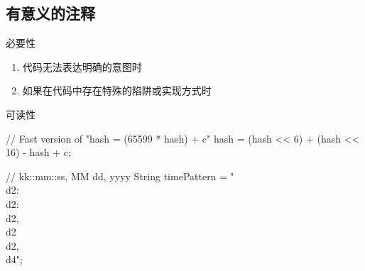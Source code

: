 \subsection{有意义的注释}

\begin{frame}[fragile]{必要性}
\begin{enumerate}
  \item 代码无法表达明确的意图时
  \item 如果在代码中存在特殊的陷阱或实现方式时
\end{enumerate}
\end{frame}

\begin{frame}[fragile]{可读性}
\begin{java}
// Fast version of "hash = (65599 * hash) + c"
hash = (hash << 6) + (hash << 16) - hash + c;

// kk::mm::ss, MM dd, yyyy
String timePattern = "\\d{2}:\\d{2}:\\d{2}, \\d{2} \\d{2}, \\d{4}";
\end{java}
\end{frame}
